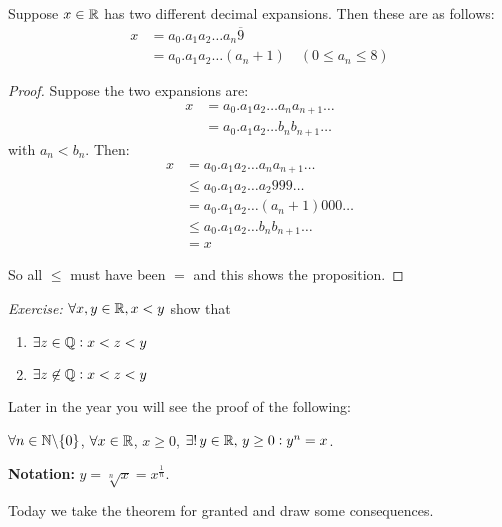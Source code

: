 \documentclass[twoside]{scrartcl}
\begin{document}
\begin{proposition}
Suppose $x\in\mathbb{R}$ has two different decimal expansions. Then these are as follows: 
\[
\begin{aligned}
  x &= a_0 . a_1a_2\dots a_n \overline{9}\\
  &= a_0. a_1a_2\dots (a_{n} + 1) \quad (0 \leq a_n \leq 8)
\end{aligned}
\]
\end{proposition}

\begin{proof}
Suppose the two expansions are:
\[
\begin{aligned}
  x &= a_0 . a_1 a_2 \dots a_n a_{n+1} \dots\\
  &= a_0 . a_1 a_2 \dots b_n b_{n+1} \dots 
\end{aligned}
\]
with $a_n < b_n$. Then: 
\[
\begin{aligned}
   x &= a_0 . a_1 a_2 \dots a_n a_{n+1} \dots \\
   &\leq a_0 . a_1a_2 \dots a_2 999\dots\\
   &= a_0 . a_1a_2 \dots (a_{n} + 1) 000\dots\\
   &\leq a_0 . a_1 a_2 \dots b_n b_{n+1} \dots \\
   &= x
\end{aligned}
\]

So all $\leq$ must have been $=$ and this shows the proposition. 
\end{proof}

\textit{Exercise:} $\forall x,y \in\mathbb{R}, x < y$ show that 
\begin{enumerate}
\item $\exists z \in\mathbb{Q}: x < z < y$
\item $\exists 	z \not \in \mathbb{Q}: x < z < y$
\end{enumerate}




Later in the year you will see the proof of the following: 
\begin{theorem} 
$\forall n \in\mathbb{N} \backslash \{0\}$, $\forall x \in\mathbb{R}$, $x \geq 0$, $\exists!\, y \in\mathbb{R},\, y \geq 0: y^n = x$. 	
\end{theorem}

\textbf{Notation:} $y = \sqrt[n]{x} = x^{\frac{1}{n}}$. 

Today we take the theorem for granted and draw some consequences. \\
\end{document}

